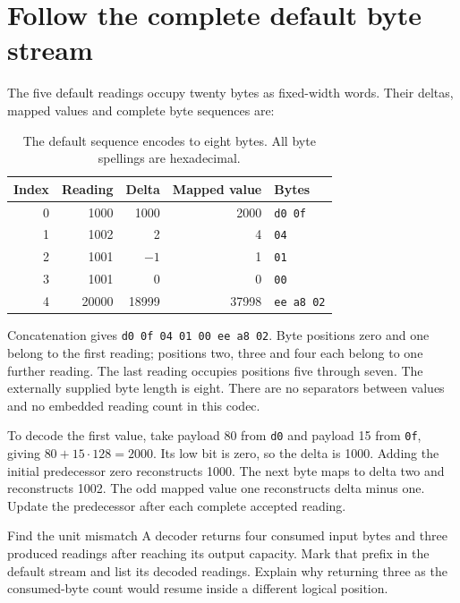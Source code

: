 \section{Follow the complete default byte stream}
The five default readings occupy twenty bytes as fixed-width words. Their deltas,
mapped values and complete byte sequences are:
\begin{table}[htbp]
  \centering
  \caption{The default sequence encodes to eight bytes. All byte spellings are hexadecimal.}
  \begin{tabular}{rrrrl}
    \toprule
    Index & Reading & Delta  & Mapped value & Bytes             \\
    \midrule
    0     & 1000    & 1000   & 2000         & \texttt{d0 0f}    \\
    1     & 1002    & 2      & 4            & \texttt{04}       \\
    2     & 1001    & \(-1\) & 1            & \texttt{01}       \\
    3     & 1001    & 0      & 0            & \texttt{00}       \\
    4     & 20000   & 18999  & 37998        & \texttt{ee a8 02} \\
    \bottomrule
  \end{tabular}
\end{table}

Concatenation gives \texttt{d0 0f 04 01 00 ee a8 02}. Byte positions zero and one
belong to the first reading; positions two, three and four each belong to one further
reading. The last reading occupies positions five through seven. The externally
supplied byte length is eight. There are no separators between values and no embedded
reading count in this codec.

To decode the first value, take payload 80 from \texttt{d0} and payload 15 from
\texttt{0f}, giving \(80+15\cdot128=2000\). Its low bit is zero, so the delta is
1000. Adding the initial predecessor zero reconstructs 1000. The next byte maps to
delta two and reconstructs 1002. The odd mapped value one reconstructs delta minus one.
Update the predecessor after each complete accepted reading.

\begin{MARSExercise}{Find the unit mismatch}
  A decoder returns four consumed input bytes and three produced readings after reaching
  its output capacity. Mark that prefix in the default stream and list its decoded
  readings. Explain why returning three as the consumed-byte count would resume inside
  a different logical position.
\end{MARSExercise}
